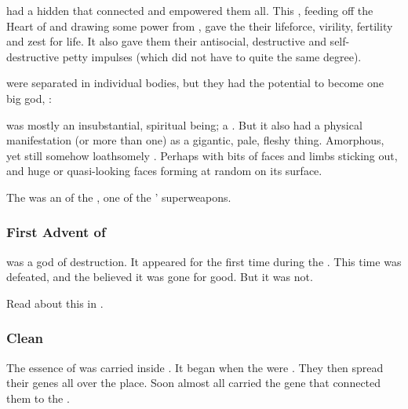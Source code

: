 \Humanity{} had a hidden \matrix{} that connected and empowered them all. 
This \matrix{}, feeding off the Heart of \Miith{} and drawing some power from \Erebos, gave the \humans{} their lifeforce, virility, fertility and zest for life. 
It also gave them their antisocial, destructive and self-destructive petty impulses (which \scathae{} did not have to quite the same degree).

\Humans{} were separated in individual bodies, but they had the potential to become one big god, \Lithrim: 


\Lithrim was mostly an insubstantial, spiritual being; a \matrix. 
But it also had a physical manifestation (or more than one) as a gigantic, pale, fleshy thing. 
Amorphous, yet still somehow loathsomely \human. 
Perhaps with bits of \human faces and limbs sticking out, and huge \human or quasi-\human looking faces forming at random on its surface. 

The \Lithrim was an  of the \SitraAchras, one of the \banes' superweapons. 





\subsubsection{First Advent of \Lithrim}
\Lithrim was a \bane god of destruction. 
It appeared for the first time during the . 
This time \Lithrim was defeated, and the \dragons believed it was gone for good. 
But it was not. 

Read about this in . 





\subsubsection{Clean \humans}
The essence of \Lithrim was carried inside \humans.
It began when the  were . 
They then spread their genes all over the place. 
Soon almost all \humans carried the gene that connected them to the \Lithrim \matrix.

